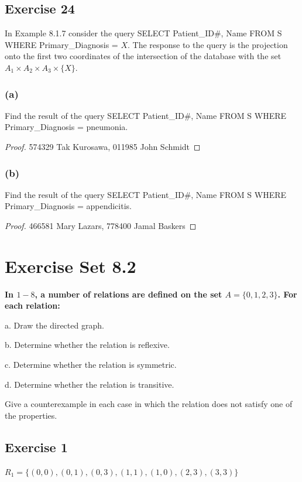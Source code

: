 \documentclass[14pt]{extarticle}
\newcommand{\cy}{\color{cyan}}
\begin{document}
\subsection{Exercise 24}
In Example 8.1.7 consider the query SELECT Patient\_ID\#, Name FROM S WHERE Primary\_Diagnosis = $X$. The response to 
the query is the projection onto the first two coordinates of the intersection of the database with the set 
\(A_1 \times A_2 \times A_3 \times \{X\}\).

\subsubsection{(a)}
Find the result of the query SELECT Patient\_ID\#, Name FROM S WHERE Primary\_Diagnosis = pneumonia.

\begin{proof}
574329 Tak Kurosawa, 011985 John Schmidt
\end{proof}

\subsubsection{(b)}
Find the result of the query SELECT Patient\_ID\#, Name FROM S WHERE Primary\_Diagnosis = appendicitis.

\begin{proof}
466581 Mary Lazars, 778400 Jamal Baskers
\end{proof}

\section{Exercise Set 8.2}

{\bf \cy In $1-8$, a number of relations are defined on the set \(A = \{0, 1, 2, 3\}\). For each relation:

a. Draw the directed graph.

b. Determine whether the relation is reflexive.

c. Determine whether the relation is symmetric.

d. Determine whether the relation is transitive.

Give a counterexample in each case in which the relation does not satisfy one of the properties.}

\subsection{Exercise 1}
\(R_1 = \{(0, 0), (0, 1), (0, 3), (1, 1), (1, 0), (2, 3), (3, 3)\}\)
\end{document}
